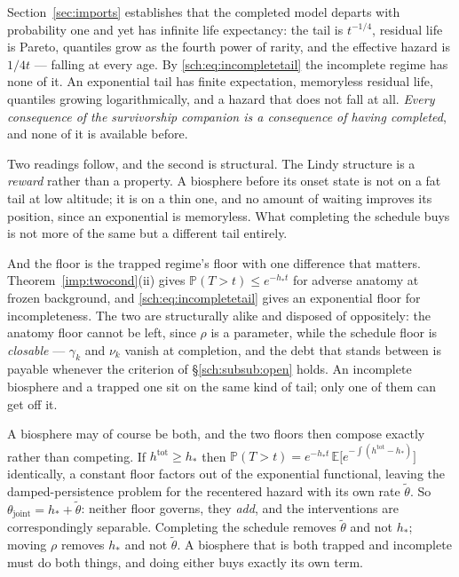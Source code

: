 \documentclass[11pt]{article}
\newcommand{\E}{\mathbb{E}}
\newcommand{\PP}{\mathbb{P}}
\theoremstyle{plain}
\theoremstyle{definition}
\theoremstyle{remark}
\begin{document}
Section~\ref{sec:imports} establishes that the completed model departs with
probability one and yet has infinite life expectancy: the tail is
$t^{-1/4}$, residual life is Pareto, quantiles grow as the fourth power
of rarity, and the effective hazard is $1/4t$ --- falling at every age.
By \eqref{sch:eq:incompletetail} the incomplete regime has none of it.
An exponential tail has finite expectation, memoryless residual life,
quantiles growing logarithmically, and a hazard that does not fall at
all. \emph{Every consequence of the survivorship companion \cite{SurvA} is a
consequence of having completed}, and none of it is available before.

Two readings follow, and the second is structural. The Lindy structure is a \emph{reward} rather than a property. A
biosphere before its onset state is not on a fat tail at low altitude;
it is on a thin one, and no amount of waiting improves its position,
since an exponential is memoryless. What completing the schedule buys is
not more of the same but a different tail entirely.

And the floor is the trapped regime's floor with one difference that
matters. Theorem~\ref{imp:twocond}(ii) gives $\PP(T>t)\le e^{-h_\ast t}$
for adverse anatomy at frozen background, and \eqref{sch:eq:incompletetail}
gives an
exponential floor for incompleteness. The two are structurally alike and
disposed of oppositely: the anatomy floor cannot be left, since $\rho$ is
a parameter, while the schedule floor is \emph{closable} --- $\gamma_k$
and $\nu_k$ vanish at completion, and the debt that stands between is
payable whenever the criterion of \S\ref{sch:subsub:open} holds. An
incomplete biosphere and a trapped one sit on the same kind of tail; only
one of them can get off it.

A biosphere may of course be both, and the two floors then compose
exactly rather than competing. If $h^{\mathrm{tot}}\ge h_\ast$ then
$\PP(T>t)=e^{-h_\ast t}\,\E\bigl[e^{-\int(h^{\mathrm{tot}}-h_\ast)}\bigr]$
identically, a constant floor factors out of the exponential
functional, leaving the damped-persistence problem for the recentered
hazard with its own rate $\tilde\theta$. So
$\theta_{\mathrm{joint}}=h_\ast+\tilde\theta$: neither floor governs, they
\emph{add}, and the interventions are correspondingly separable.
Completing the schedule removes $\tilde\theta$ and not $h_\ast$; moving
$\rho$ removes $h_\ast$ and not $\tilde\theta$. A biosphere that is both
trapped and incomplete must do both things, and doing either buys exactly
its own term.
\end{document}
